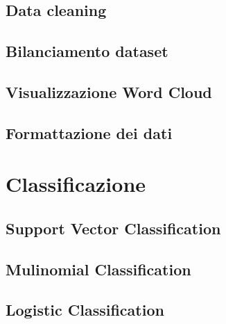 \documentclass[12pt,oneside]{article}
\begin{document}
    \begin{enumerate}
    \subsection{Data cleaning}
    \begin{justify}
    
    \end{justify}
    \end{enumerate}

    \begin{enumerate}
    \subsection{Bilanciamento dataset}
    \end{enumerate}

    \begin{enumerate}
    \subsection{Visualizzazione Word Cloud}
    \end{enumerate}

    \begin{enumerate}
    \subsection{Formattazione dei dati}
    \end{enumerate}


\section{Classificazione}
    \begin{enumerate}
    \subsection{Support Vector Classification}
    \end{enumerate}
   
    \begin{enumerate}
    \subsection{Mulinomial Classification}
    \end{enumerate}
    
    \begin{enumerate}
    \subsection{Logistic Classification}
    \end{enumerate}
\end{document}
